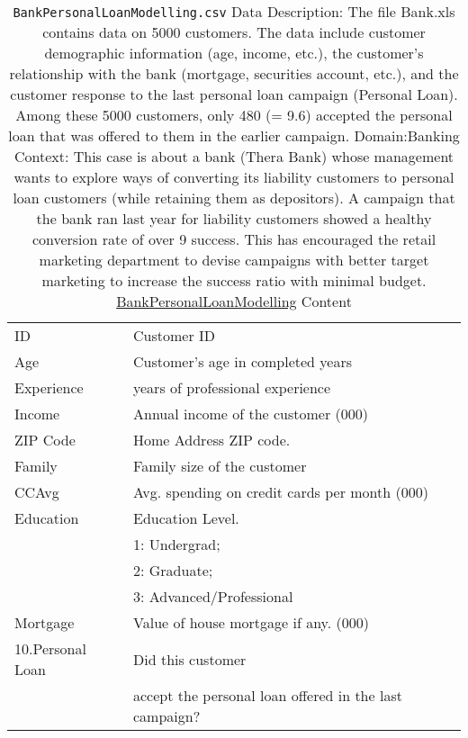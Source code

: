 \documentclass[12pt]{article}
\theoremstyle{remark}
\begin{document}
\begin{table}
	\caption{ \texttt{BankPersonalLoanModelling.csv}
Data Description:
The file Bank.xls contains data on 5000 customers. The data include customer demographic information (age, income, etc.), the customer's relationship with the bank (mortgage, securities account, etc.), and the customer response to the last personal loan campaign (Personal Loan). Among these 5000 customers, only 480 (= 9.6) accepted the personal loan that was offered to them in the earlier campaign.
Domain:Banking
Context:
This case is about a bank (Thera Bank) whose management wants to explore ways of converting its liability customers to personal loan customers (while retaining them as depositors). A campaign that the bank ran last year for liability customers showed a healthy conversion rate of over 9 success. This has encouraged the retail marketing department to devise campaigns with better target marketing to increase the success ratio with minimal budget.
\href{https://www.kaggle.com/datasets/krantiswalke/bank-personal-loan-modelling}{BankPersonalLoanModelling} Content
}
	\begin{tabular}{l|l}\hline

ID & Customer ID\\

Age & Customer's age in completed years \\

Experience & years of professional experience\\

Income & Annual income of the customer (000)\\

ZIP Code & Home Address ZIP code.\\

Family & Family size of the customer\\

CCAvg & Avg. spending on credit cards per month (000)\\

Education & Education Level.\\
& 1: Undergrad;\\
& 2: Graduate;\\
& 3: Advanced/Professional\\

Mortgage & Value of house mortgage if any. (000)\\

10.Personal Loan & Did this customer \\
& accept the personal loan offered in the last campaign?\\


\end{tabular}
\end{table}
\end{document}
